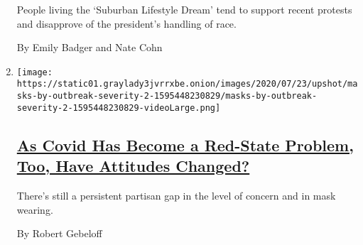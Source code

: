 \begin{enumerate}
  People living the `Suburban Lifestyle Dream' tend to support recent
  protests and disapprove of the president's handling of race.

  By Emily Badger and Nate Cohn
\item
  \texttt{[image: https://static01.graylady3jvrrxbe.onion/images/2020/07/23/upshot/masks-by-outbreak-severity-2-1595448230829/masks-by-outbreak-severity-2-1595448230829-videoLarge.png]}

  \hypertarget{as-covid-has-become-a-red-state-problem-too-have-attitudes-changed}{%
  \subsection{\texorpdfstring{\href{/2020/07/30/upshot/coronavirus-republican-voting.html}{As
  Covid Has Become a Red-State Problem, Too, Have Attitudes
  Changed?}}{As Covid Has Become a Red-State Problem, Too, Have Attitudes Changed?}}\label{as-covid-has-become-a-red-state-problem-too-have-attitudes-changed}}

  There's still a persistent partisan gap in the level of concern and in
  mask wearing.

  By Robert Gebeloff
\end{enumerate}

